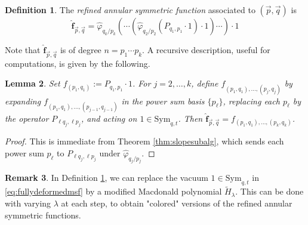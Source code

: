 \documentclass{amsart}
\numberwithin{equation}{section}
\newtheorem{lemma}{Lemma}[section]
\theoremstyle{definition}
\newtheorem{remark}[lemma]{Remark}%
\newtheorem{definition}[lemma]{Definition}%
\def\hat{\widehat}
\def\Sym{{\mathrm{Sym}}}
\newcommand{\tH}{\widetilde{H}}
\newcommand{\fqrs}{\hat{\mathbf{f}}_{\vec{p},\vec{q}}}
\begin{document}
\begin{definition}
\label{def:fullmastersymfn}
The {\em refined annular symmetric function} associated to $(\vec{p},\vec{q})$ is 
\begin{equation}
\label{eq:fullydeformedmsf}
\fqrs=\widehat{\varphi}_{q_k/p_k}(\cdots(\widehat{\varphi}_{q_{2}/p_{2}}(P_{q_1,p_1}\cdot 1)\cdot 1)\cdots)\cdot 1
\end{equation}
\end{definition}
Note that $\fqrs$ is of degree $n=p_1\cdots p_k$.
A recursive description, useful for computations, is given by the following.
\begin{lemma}\label{lem:fqrs-recursive}
Set $f_{(p_1,q_1)} := P_{q_1,p_1}\cdot 1$. For $j=2,\ldots,k$, define $f_{(p_1,q_1),\ldots,(p_j,q_j)}$ by expanding $f_{(p_1,q_1),\ldots,(p_{j-1},q_{j-1})}$ in the power sum basis $\{p_\ell\}$, replacing each $p_\ell$ by the operator $P_{\ell q_j, \ell p_j}$, and acting on $1\in\Sym_{q,t}$. Then $\fqrs = f_{(p_1,q_1),\ldots,(p_k,q_k)}$.
\end{lemma}
\begin{proof}
This is immediate from Theorem \ref{thm:slopesubalg}, which sends each power sum $p_\ell$ to $P_{\ell q_j, \ell p_j}$ under $\widehat\varphi_{q_j/p_j}$.
\end{proof}
\begin{remark}
In Definition \ref{def:fullmastersymfn}, we can replace the vacuum $1\in\Sym_{q,t}$ in \eqref{eq:fullydeformedmsf} by a modified Macdonald polynomial $\tH_\lambda$. This can be done with varying $\lambda$ at each step, to obtain "colored" versions of the refined annular symmetric functions. %


\end{remark}
\end{document}
